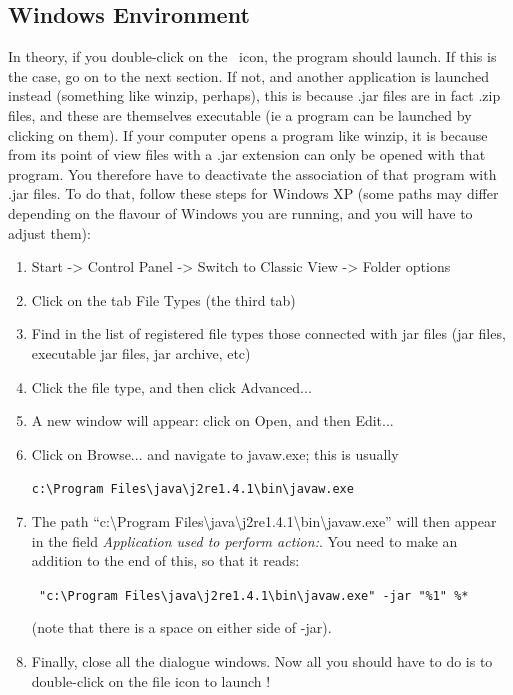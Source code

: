 \subsection{Windows Environment}
In theory, if you double-click on the \xlogo\ icon, the program should launch.
If this is the case, go on to the next section.  If not, and another application is launched instead (something like winzip, perhaps), this is because .jar files are in fact .zip files, and these are themselves executable (ie a program can be launched by clicking on them).  If your computer opens a program like winzip, it is because from its point of view files with a .jar extension can only be opened with that program.  You therefore have to deactivate the association of that program with .jar files.  To do that, follow these steps for Windows XP (some paths may differ depending on the flavour of Windows you are running, and you will have to adjust them):

\begin{enumerate}
\item Start -> Control Panel -> Switch to Classic View  -> Folder options
\item Click on the tab File Types (the third tab)
\item Find in the list of registered file types those connected with jar files (jar files, executable jar files, jar archive, etc)
\item Click the file type, and then click Advanced...
\item A new window will appear: click on Open, and then Edit...
\item Click on Browse... and navigate to javaw.exe; this is usually
\begin{center}
\texttt{c:\textbackslash{}Program Files\textbackslash{}java\textbackslash{}j2re1.4.1\textbackslash{}bin\textbackslash{}javaw.exe}
\end{center}
\item The path {}``c:\textbackslash{}Program Files\textbackslash{}java\textbackslash{}j2re1.4.1\textbackslash{}bin\textbackslash{}javaw.exe'' will then appear in the field \textit{Application used to perform action:}.  You need to make an addition to the end of this, so that it reads:
\begin{center}
\texttt{ "c:\textbackslash{}Program Files\textbackslash{}java\textbackslash{}j2re1.4.1\textbackslash{}bin\textbackslash{}javaw.exe" -jar {}"\%1" \%{*}}
\end{center}
(note that there is a space on either side of -jar).
\item Finally, close all the dialogue windows.  Now all you should have to do is to double-click on the file icon to launch \xlogo!
\end{enumerate}

